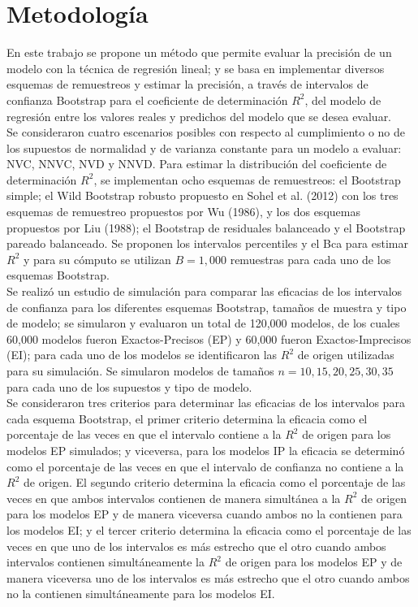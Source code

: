 \section{Metodología}
En este trabajo se propone un método que permite evaluar la precisión de un modelo con la técnica de regresión lineal; y se basa en implementar diversos esquemas de remuestreos y estimar la precisión, a través de intervalos de confianza Bootstrap para el coeficiente de determinación $R^2$, del modelo de regresión entre los valores reales y predichos del modelo que se desea evaluar.\\

Se consideraron cuatro escenarios posibles con respecto al cumplimiento o no de los supuestos de normalidad y de varianza constante para un modelo a evaluar: NVC, NNVC, NVD y NNVD. Para estimar la distribución del coeficiente de determinación $R^2$, se implementan ocho esquemas de remuestreos: el Bootstrap simple; el Wild Bootstrap robusto propuesto en Sohel et al. (2012) con los tres esquemas de remuestreo propuestos por Wu (1986), y los dos esquemas propuestos por Liu (1988); el Bootstrap de residuales balanceado y el Bootstrap pareado balanceado. Se proponen los intervalos percentiles y el Bca para estimar $R^2$ y para su cómputo se utilizan $B=1,000$ remuestras para cada uno de los esquemas Bootstrap.\\ 

Se realizó un estudio de simulación para comparar las eficacias de los intervalos de confianza para los diferentes esquemas Bootstrap, tamaños de muestra y tipo de modelo; se simularon y evaluaron un total de 120,000 modelos, de los cuales 60,000 modelos fueron Exactos-Precisos (EP) y 60,000 fueron Exactos-Imprecisos (EI); para cada uno de los modelos se identificaron las $R^2$ de origen utilizadas para su simulación. Se simularon modelos de tamaños $n=10, 15, 20, 25, 30, 35$ para cada uno de los supuestos y tipo de modelo.\\  

Se consideraron tres criterios para determinar las eficacias de los intervalos para cada esquema Bootstrap, el primer criterio determina la eficacia como el porcentaje de las veces en que el intervalo contiene a la $R^2$ de origen para los modelos EP simulados; y viceversa, para los modelos IP la eficacia se determinó como el porcentaje de las veces en que el intervalo de confianza no contiene a la $R^2$ de origen. El segundo criterio determina la eficacia como el porcentaje de las veces en que ambos intervalos contienen de manera simultánea a la $R^2$ de origen para los modelos EP y de manera viceversa cuando ambos no la contienen para los modelos EI; y el tercer criterio determina la eficacia como el porcentaje de las veces en que uno de los intervalos es más estrecho que el otro cuando ambos intervalos contienen simultáneamente la $R^2$ de origen para los modelos EP y de manera viceversa uno de los intervalos es más estrecho que el otro cuando ambos no la contienen simultáneamente para los modelos EI.\\

